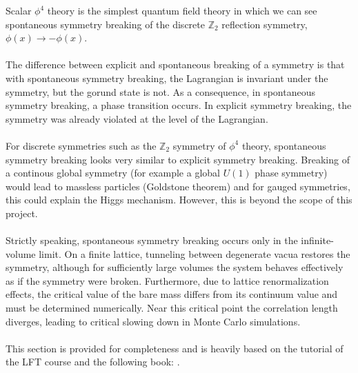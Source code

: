 Scalar $\phi^4$ theory is the simplest quantum field theory in which we can see spontaneous symmetry breaking of the discrete $\mathbb{Z}_2$ reflection symmetry, $\phi(x) \rightarrow -\phi(x)$. \\\\
The difference between explicit and spontaneous breaking of a symmetry is that with spontaneous symmetry breaking, the Lagrangian is invariant under the symmetry, but the gorund state is not. As a consequence, in spontaneous symmetry breaking, a phase transition occurs. In explicit symmetry breaking, the symmetry was already violated at the level of the Lagrangian. \\\\
For discrete symmetries such as the $\mathbb{Z}_2$ symmetry of $\phi^4$ theory, spontaneous symmetry breaking looks very similar to explicit symmetry breaking. Breaking of a continous global symmetry (for example a global $U(1)$ phase symmetry) would lead to massless particles (Goldstone theorem) and for gauged symmetries, this could explain the Higgs mechanism. However, this is beyond the scope of this project. \cite{SchwartzQFT}\\\\
Strictly speaking, spontaneous symmetry breaking occurs only in the infinite-volume limit. On a finite lattice, tunneling between degenerate vacua restores the symmetry, although for sufficiently large volumes the system behaves effectively as if the symmetry were broken. Furthermore, due to lattice renormalization effects, the critical value of the bare mass differs from its continuum value and must be determined numerically. Near this critical point the correlation length diverges, leading to critical slowing down in Monte Carlo simulations. \cite{SchwartzQFT,GattingerLang}\\\\
This section is provided for completeness and is heavily based on the tutorial of the LFT course and the following book: \cite{SchwartzQFT}.
